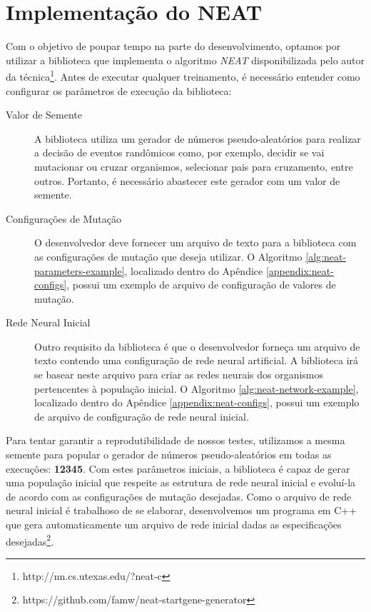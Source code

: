 \section{\label{section:neat-details}Implementação do NEAT}
Com o objetivo de poupar tempo na parte do desenvolvimento, optamos por utilizar
a biblioteca que implementa o algoritmo \textit{NEAT} disponibilizada pelo autor
da técnica\footnote{http://nn.cs.utexas.edu/?neat-c}. Antes de executar qualquer
treinamento, é necessário entender como configurar os parâmetros de execução da
biblioteca:

\begin{description}
	\item[Valor de Semente]
		A biblioteca utiliza um gerador de números pseudo-aleatórios para
		realizar a decisão de eventos randômicos como, por exemplo, decidir se
		vai mutacionar ou cruzar organismos, selecionar pais para cruzamento,
		entre outros. Portanto, é necessário abastecer este gerador com um valor
		de semente.

	\item[Configurações de Mutação]
		O desenvolvedor deve fornecer um arquivo de texto para a biblioteca com
		as configurações de mutação que deseja utilizar. O Algoritmo
		\ref{alg:neat-parameters-example}, localizado dentro do Apêndice
		\ref{appendix:neat-configs}, possui um exemplo de arquivo de
		configuração de valores de mutação.

	\item[Rede Neural Inicial]
		Outro requisito da biblioteca é que o desenvolvedor forneça um arquivo
		de texto contendo uma configuração de rede neural artificial. A
		biblioteca irá se basear neste arquivo para criar as redes neurais dos
		organismos pertencentes à população inicial. O Algoritmo
		\ref{alg:neat-network-example}, localizado dentro do Apêndice
		\ref{appendix:neat-configs}, possui um  exemplo de arquivo de
		configuração de rede neural inicial.
\end{description}

Para tentar garantir a reprodutibilidade de nossos testes, utilizamos a mesma
semente para popular o gerador de números pseudo-aleatórios em todas as
execuções: \textbf{12345}. Com estes parâmetros iniciais, a biblioteca é capaz
de gerar uma população inicial que respeite as estrutura de rede neural inicial
e evoluí-la de acordo com as configurações de mutação desejadas. Como o arquivo
de rede neural inicial é trabalhoso de se elaborar, desenvolvemos um programa em
C++ que gera automaticamente um arquivo de rede inicial dadas as especificações
desejadas\footnote{https://github.com/famw/neat-startgene-generator}.

